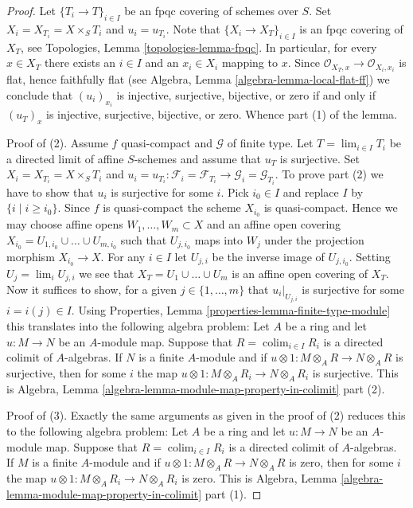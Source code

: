 \documentclass[10pt,a4paper]{amsart}
\theoremstyle{plain}
\theoremstyle{definition}
\theoremstyle{remark}
\numberwithin{equation}{subsection}
\def\lim{\mathop{\mathrm{lim}}\nolimits}
\def\colim{\mathop{\mathrm{colim}}\nolimits}
\begin{document}
\begin{proof}
Let $\{T_i \to T\}_{i \in I}$ be an fpqc covering of schemes over $S$.
Set $X_i = X_{T_i} = X \times_S T_i$ and $u_i = u_{T_i}$.
Note that $\{X_i \to X_T\}_{i \in I}$ is an fpqc covering of $X_T$, see
Topologies, Lemma \ref{topologies-lemma-fpqc}.
In particular, for every $x \in X_T$ there exists an $i \in I$
and an $x_i \in X_i$ mapping to $x$. Since
$\mathcal{O}_{X_T, x} \to \mathcal{O}_{X_i, x_i}$ is flat, hence
faithfully flat (see
Algebra, Lemma \ref{algebra-lemma-local-flat-ff})
we conclude that $(u_i)_{x_i}$ is injective, surjective, bijective, or zero
if and only if $(u_T)_x$ is injective, surjective, bijective, or zero.
Whence part (1) of the lemma.

\medskip\noindent
Proof of (2). Assume $f$ quasi-compact and $\mathcal{G}$ of finite type.
Let $T = \lim_{i \in I} T_i$ be a directed limit of affine $S$-schemes
and assume that $u_T$ is surjective.
Set $X_i = X_{T_i} = X \times_S T_i$ and
$u_i = u_{T_i} : \mathcal{F}_i = \mathcal{F}_{T_i}
\to \mathcal{G}_i = \mathcal{G}_{T_i}$.
To prove part (2) we have to show that $u_i$ is surjective for some $i$.
Pick $i_0 \in I$ and replace $I$ by $\{i \mid i \geq i_0\}$.
Since $f$ is quasi-compact the scheme $X_{i_0}$ is quasi-compact.
Hence we may choose affine opens $W_1, \ldots, W_m \subset X$
and an affine open covering
$X_{i_0} = U_{1, i_0} \cup \ldots \cup U_{m, i_0}$ such that
$U_{j, i_0}$ maps into $W_j$ under the projection morphism $X_{i_0} \to X$.
For any $i \in I$ let $U_{j, i}$ be the inverse image of $U_{j, i_0}$.
Setting $U_j = \lim_i U_{j, i}$ we see that $X_T = U_1 \cup \ldots \cup U_m$
is an affine open covering of $X_T$. Now it suffices to show, for a given
$j \in \{1, \ldots, m\}$ that $u_i|_{U_{j, i}}$ is surjective for some
$i = i(j) \in I$. Using
Properties, Lemma \ref{properties-lemma-finite-type-module}
this translates into the following algebra problem:
Let $A$ be a ring and let $u : M \to N$ be an $A$-module map.
Suppose that $R = \colim_{i \in I} R_i$ is a directed colimit
of $A$-algebras. If $N$ is a finite $A$-module and if
$u \otimes 1 : M \otimes_A R \to N \otimes_A R$ is surjective, then
for some $i$ the map
$u \otimes 1 : M \otimes_A R_i \to N \otimes_A R_i$ is surjective.
This is
Algebra, Lemma \ref{algebra-lemma-module-map-property-in-colimit} part (2).

\medskip\noindent
Proof of (3). Exactly the same arguments as given in the proof of (2)
reduces this to the following algebra problem:
Let $A$ be a ring and let $u : M \to N$ be an $A$-module map.
Suppose that $R = \colim_{i \in I} R_i$ is a directed colimit
of $A$-algebras. If $M$ is a finite $A$-module and if
$u \otimes 1 : M \otimes_A R \to N \otimes_A R$ is zero, then
for some $i$ the map
$u \otimes 1 : M \otimes_A R_i \to N \otimes_A R_i$ is zero.
This is
Algebra, Lemma \ref{algebra-lemma-module-map-property-in-colimit} part (1).


\end{proof}
\end{document}
